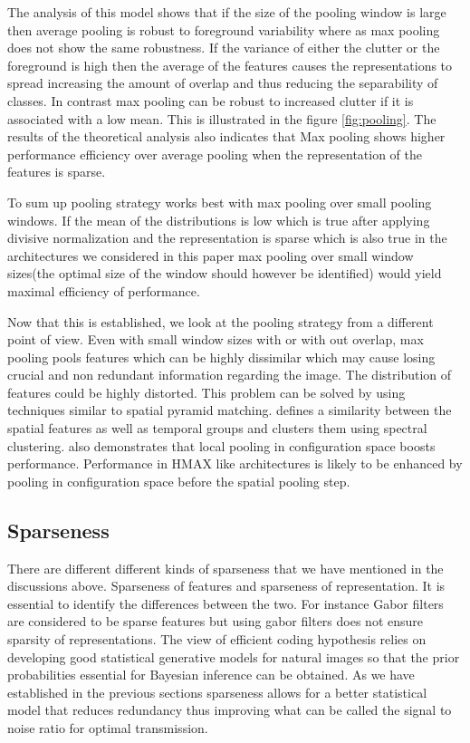 \documentclass[12pt,twoside]{article}
\theoremstyle{plain}
\theoremstyle{definition}
\theoremstyle{remark}
\begin{document}
The analysis of this model\cite{Y-LanBoureau2010a} shows that if the size of the pooling window is large then average pooling is robust to foreground variability where as max pooling does not show the same robustness. If the variance of either the clutter or the foreground is high then the average of the features causes the representations to spread increasing the amount of overlap\cite{Y-LanBoureau2010a} and thus reducing the separability of classes. In contrast max pooling can be robust to increased clutter if it is associated with a low mean. This is illustrated in the figure \ref{fig:pooling}. The results of the theoretical analysis also indicates that Max pooling shows higher performance efficiency over average pooling when the representation of the features is sparse. 

To sum up pooling strategy works best with max pooling over small pooling windows. If the mean of the distributions is low which is true after applying divisive normalization and the representation is sparse which is also true in the architectures we considered in this paper max pooling over small window sizes(the optimal size of the window should however be identified) would yield maximal efficiency of performance. 

Now that this is established, we look at the pooling strategy from a different point of view. Even with small window sizes with or with out overlap, max pooling pools features which can be highly dissimilar which may cause losing crucial and non redundant information regarding the image. The distribution of features could be highly distorted. This problem can be solved by using techniques similar to spatial pyramid matching. \cite{MarkusLessmann2014} defines a similarity between the spatial features as well as temporal groups and clusters them using spectral clustering. \cite{Y-LanBoureau2011} also demonstrates that local pooling in configuration space boosts performance. Performance in HMAX like architectures is likely to be enhanced by pooling in configuration space before the spatial pooling step. 
\subsection{Sparseness}
\label{Subsec:Sparsness}
There are different different kinds of sparseness that we have mentioned in the discussions above. Sparseness of features and sparseness of representation. It is essential to identify the differences between the two. For instance Gabor filters are considered to be sparse features but using gabor filters does not ensure sparsity of representations. The view of efficient coding hypothesis relies on developing good statistical generative models for natural images so that the prior probabilities essential for Bayesian inference can be obtained\cite{AapoHyvaerinen2009}. As we have established in the previous sections sparseness allows for a better statistical model that reduces redundancy thus improving what can be called the signal to noise ratio for optimal transmission. 
\end{document}
